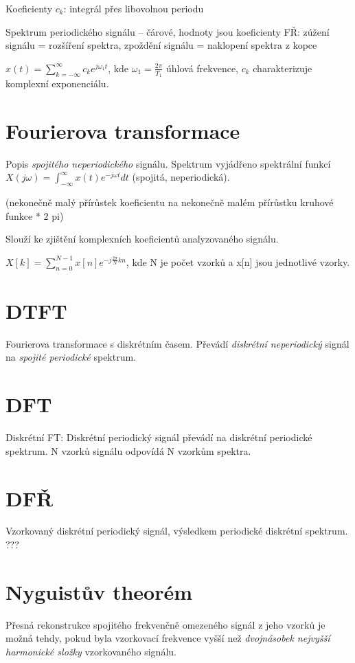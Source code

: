 \documentclass[a4paper, 11pt]{report}
\begin{document}
Koeficienty $c_k$: integrál přes libovolnou periodu

Spektrum periodického signálu -- čárové, hodnoty jsou koeficienty FŘ: zúžení signálu = rozšíření spektra, zpoždění signálu = naklopení spektra z kopce

$x(t) = \sum\limits_{k = -\infty}^\infty c_k e^{j \omega_1 t}$, kde $\omega_1 = \frac{2 \pi}{T_1}$ úhlová frekvence, $c_k$ charakterizuje komplexní exponenciálu.

\section{Fourierova transformace}
Popis \emph{spojitého neperiodického} signálu. Spektrum vyjádřeno spektrální funkcí $X(j \omega) = \int_{-\infty}^{\infty} x(t) e^{ - j \omega t} dt$ (spojitá, neperiodická).

(nekonečně malý přírůstek koeficientu na nekonečně malém přírůstku kruhové funkce * 2 pi)

Slouží ke zjištění komplexních koeficientů analyzovaného signálu.

$X[k] = \sum\limits_{n = 0}^{N-1} x[n] e^{ - j \frac{2 \pi}{N} k n}$, kde N je počet vzorků a x[n] jsou jednotlivé vzorky.

\section{DTFT} Fourierova transformace s diskrétním časem. Převádí \emph{diskrétní neperiodický} signál na \emph{spojité periodické} spektrum.

\section{DFT} Diskrétní FT: Diskrétní periodický signál převádí na diskrétní periodické spektrum. N vzorků signálu odpovídá N vzorkům spektra.

\section{DFŘ} Vzorkovaný diskrétní periodický signál, výsledkem periodické diskrétní spektrum. ???

\section{Nyguistův theorém} Přesná rekonstrukce spojitého frekvenčně omezeného signál z jeho vzorků je možná tehdy, pokud byla vzorkovací frekvence vyšší než \emph{dvojnásobek nejvyšší harmonické složky} vzorkovaného signálu.
\end{document}
